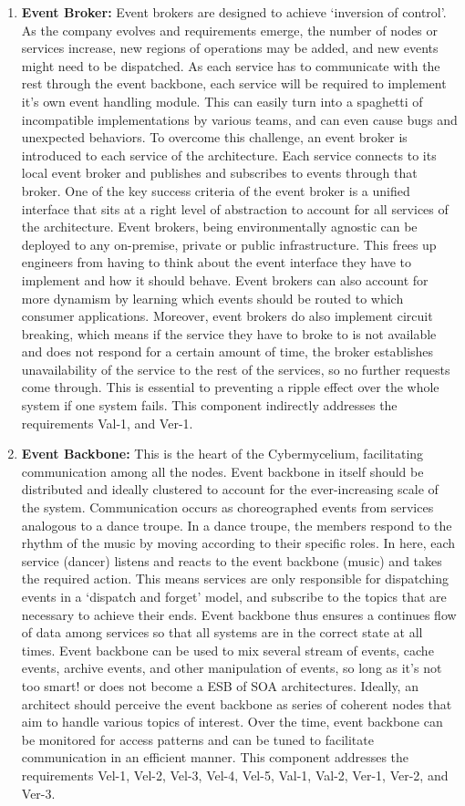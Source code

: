 \documentclass{bmcart}
\begin{document}
\begin{enumerate}
    \item \textbf{Event Broker:} Event brokers are designed to achieve `inversion of control'. As the company evolves and requirements emerge, the number of nodes or services increase, new regions of operations may be added, and new events might need to be dispatched. As each service has to communicate with the rest through the event backbone, each service will be required to implement it's own event handling module. This can easily turn into a spaghetti of incompatible implementations by various teams, and can even cause bugs and unexpected behaviors. To overcome this challenge, an event broker is introduced to each service of the architecture. Each service connects to its local event broker and publishes and subscribes to events through that broker. One of the key success criteria of the event broker is a unified interface that sits at a right level of abstraction to account for all services of the architecture. Event brokers, being environmentally agnostic can be deployed to any on-premise, private or public infrastructure. This frees up engineers from having to think about the event interface they have to implement and how it should behave. Event brokers can also account for more dynamism by learning which events should be routed to which consumer applications.  Moreover, event brokers do also implement circuit breaking, which means if the service they have to broke to is not available and does not respond for a certain amount of time, the broker establishes unavailability of the service to the rest of the services, so no further requests come through. This is essential to preventing a ripple effect over the whole system if one system fails. This component indirectly addresses the
    requirements Val-1, and Ver-1.
    \item \textbf{Event Backbone:} This is the heart of the Cybermycelium, facilitating communication among all the nodes. Event backbone in itself should be distributed and ideally clustered to account for the ever-increasing scale of the system. Communication occurs as choreographed events from services analogous to a dance troupe. In a dance troupe, the members respond to the rhythm of the music by moving according to their specific roles. In here, each service (dancer) listens and reacts to the event backbone (music) and takes the required action. This means services are only responsible for dispatching events in a `dispatch and forget' model, and subscribe to the topics that are necessary to achieve their ends. Event backbone thus ensures a continues flow of data among services so that all systems are in the correct state at all times. Event backbone can be used to mix several stream of events, cache events, archive events, and other manipulation of events, so long as it's not too smart! or does not become a ESB of SOA architectures. Ideally, an architect should perceive the event backbone as series of coherent nodes that aim to handle various topics of interest. Over the time, event backbone can be monitored for access patterns and can be tuned to facilitate communication in an efficient manner. This component addresses the requirements Vel-1, Vel-2, Vel-3, Vel-4, Vel-5, Val-1, Val-2, Ver-1, Ver-2, and Ver-3.

\end{enumerate}
\end{document}

